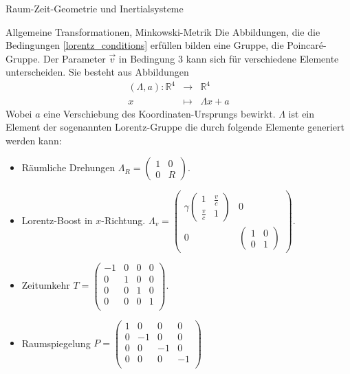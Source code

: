 \begin{chapter}{\titlestr}
\begin{section}{Raum-Zeit-Geometrie und Inertialsysteme}
\begin{subsection}{Allgemeine Transformationen, Minkowski-Metrik}
\label{allg_transf_minkowsky}
Die Abbildungen, die die Bedingungen \ref{lorentz_conditions} erfüllen bilden eine Gruppe, die Poincaré-Gruppe.
Der Parameter $\vec{v}$ in Bedingung 3 kann sich für verschiedene Elemente unterscheiden.
Sie besteht aus Abbildungen 
\begin{eqnarray*}
(\Lambda,a): \mathbb{R}^4 &\rightarrow& \mathbb{R}^4\\
x &\mapsto& \Lambda x + a
\end{eqnarray*}
Wobei $a$ eine Verschiebung des Koordinaten-Ursprungs bewirkt. $\Lambda$ ist ein Element der sogenannten Lorentz-Gruppe
die durch folgende Elemente generiert werden kann:
\begin{itemize}
	\item Räumliche Drehungen $\Lambda_R=\begin{pmatrix}
	1 & 0 \\
	0 & R
	\end{pmatrix}$.
	\item Lorentz-Boost in $x$-Richtung. $\Lambda_v=\begin{pmatrix}
\gamma
\begin{pmatrix}
1 & \frac{v}{c}\\
\frac{v}{c} & 1
\end{pmatrix} & 0\\
0 & \begin{pmatrix}
1& 0\\
0 & 1
\end{pmatrix}
\end{pmatrix}
$.
\item Zeitumkehr $T=\begin{pmatrix}
	-1 & 0 & 0 & 0\\
	0 & 1 & 0 & 0\\
	0 & 0 & 1 & 0\\
	0 & 0 & 0 & 1\\
	\end{pmatrix}$.
\item Raumspiegelung $P=\begin{pmatrix}
	1 & 0 & 0 & 0\\
	0 & -1 & 0 & 0\\
	0 & 0 & -1 & 0\\
	0 & 0 & 0 & -1\\
	\end{pmatrix}$
\end{itemize}
\end{subsection}

\end{section}
\end{chapter}
